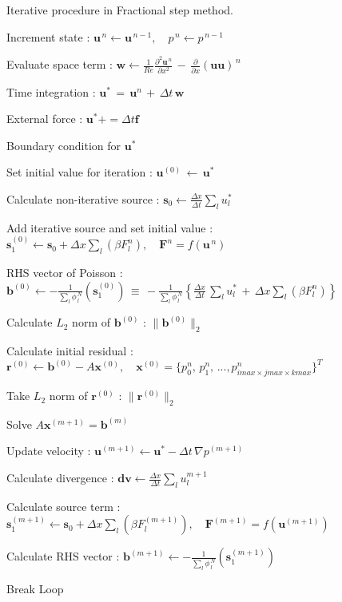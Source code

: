 \begin{algorithm}
\caption{Iterative procedure in Fractional step method.}
\label{algo:FS}
\begin{algorithmic}

\State Increment state : $\bm{u}^{\,n} \gets  \bm{u}^{\,n-1}, \quad p^{\,n} \gets  p^{\,n-1}$

\State Evaluate space term : $\displaystyle{ \bm{w} \gets \frac{1}{Re} \frac{\partial^2 \bm{u}^{\,n}}{\partial x^2} \,-\, \frac{\partial}{\partial x} (\bm{u} \bm{u})^{\,n} }$

\State Time integration : $\bm{u}^* \,=\, \bm{u}^n \,+\, \Delta t \, \bm{w}$

\State External force : $\bm{u}^* += \Delta t \bm{f}$

\State Boundary condition for $\bm{u}^*$

\State Set initial value for iteration : $\bm{u}^{(0)} \,\gets \, \bm{u}^*$

\State Calculate non-iterative source : $ \displaystyle{ \bm{s}_0 \gets \frac{\Delta x}{\Delta t} \sum \limits_l u^*_l }$

\State Add iterative source and set initial value : $\bm{s}_1^{(0)} \gets \bm{s}_0 + \Delta x \sum \limits_l (\beta F^n_l), \quad \bm{F}^n = f(\bm{u}^{\,n})$

\State RHS vector of Poisson : $ \displaystyle{ \bm{b}^{(0)} \gets - \frac{1}{\sum \limits_l \phi^{\,N}_{\,l}} \left( \bm{s}_1^{(0)} \right) \,\equiv\,
- \frac{1}{\sum \limits_l \phi^{\,N}_{\,l}} 
\left\{ \frac{\Delta x}{\Delta t} \,\sum \limits_l u^*_l \,+\, \Delta x \sum \limits_l (\beta F^n_l) \right\} }$

\State Calculate $L_2$ norm of $\bm{b}^{(0)}$ : $\| \bm{b}^{(0)} \|_2$

\State Calculate initial residual : $ \bm{r}^{(0)} \gets \bm{b}^{(0)} -A \bm{x}^{(0)}, \quad \bm{x}^{(0)} = \{p^n_0,\,p^n_1,\,...,p^n_{imax \times jmax \times kmax}\}^T$

\State Take $L_2$ norm of $\bm{r}^{(0)}$ : $\| \bm{r}^{(0)} \|_2$


\State Solve $A \bm{x}^{(m+1)} = \bm{b}^{(m)}$

\State Update velocity : $\bm{u}^{(m+1)} \gets \bm{u}^* - \Delta t \,\nabla p^{(m+1)}$

\State Calculate divergence : $\displaystyle{ \bm{dv} \gets \frac{\Delta x}{\Delta t} \sum \limits_l u^{m+1}_l }$

\State Calculate source term : $\bm{s}_1^{(m+1)} \gets \bm{s}_0 + \Delta x \sum \limits_l \left(\beta F^{(m+1)}_l \right), \quad \bm{F}^{(m+1)} = f(\bm{u}^{(m+1)})$

\State Calculate RHS vector : $ \displaystyle{ \bm{b}^{(m+1)} \gets - \frac{1}{\sum \limits_l \phi^{\,N}_{\,l}} \left( \bm{s}_1^{(m+1)} \right)}$

\State Break Loop
\EndIf

\EndFor

\end{algorithmic}
\end{algorithm}




